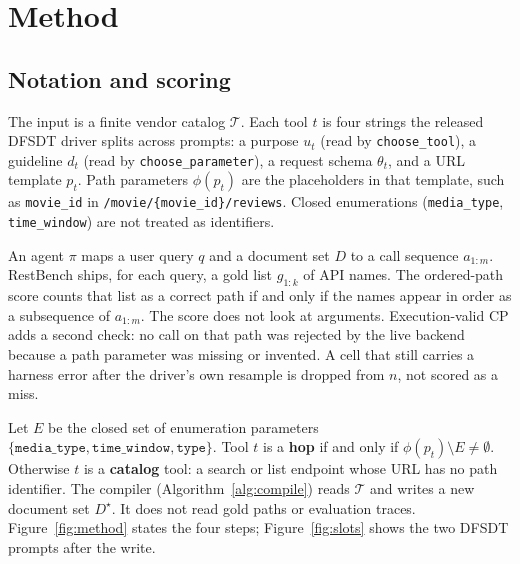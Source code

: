 \documentclass[11pt,a4paper]{article}
\begin{document}
\FloatBarrier
\section{Method}

\subsection{Notation and scoring}
\label{sec:setup}

The input is a finite vendor catalog $\mathcal{T}$. Each tool $t$ is four strings the released DFSDT driver splits across prompts: a purpose $u_t$ (read by \texttt{choose\_tool}), a guideline $d_t$ (read by \texttt{choose\_parameter}), a request schema $\theta_t$, and a URL template $p_t$. Path parameters $\phi(p_t)$ are the placeholders in that template, such as \texttt{movie\_id} in \texttt{/movie/\{movie\_id\}/reviews}. Closed enumerations (\texttt{media\_type}, \texttt{time\_window}) are not treated as identifiers.

An agent $\pi$ maps a user query $q$ and a document set $D$ to a call sequence $a_{1:m}$. RestBench ships, for each query, a gold list $g_{1:k}$ of API names. The ordered-path score counts that list as a correct path if and only if the names appear in order as a subsequence of $a_{1:m}$. The score does not look at arguments. Execution-valid CP adds a second check: no call on that path was rejected by the live backend because a path parameter was missing or invented. A cell that still carries a harness error after the driver's own resample is dropped from $n$, not scored as a miss.

Let $E$ be the closed set of enumeration parameters $\{\texttt{media\_type},\texttt{time\_window},\texttt{type}\}$. Tool $t$ is a \textbf{hop} if and only if $\phi(p_t)\setminus E\neq\emptyset$. Otherwise $t$ is a \textbf{catalog} tool: a search or list endpoint whose URL has no path identifier. The compiler (Algorithm~\ref{alg:compile}) reads $\mathcal{T}$ and writes a new document set $D^\star$. It does not read gold paths or evaluation traces. Figure~\ref{fig:method} states the four steps; Figure~\ref{fig:slots} shows the two DFSDT prompts after the write.
\end{document}
